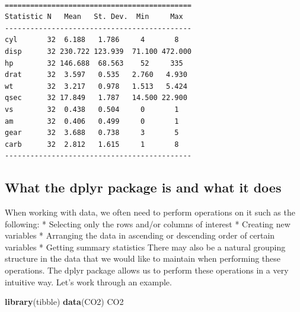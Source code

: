 \documentclass[
]{article}
\newenvironment{Shaded}{\begin{snugshade}}{\end{snugshade}}
\newcommand{\FunctionTok}[1]{\textcolor[rgb]{0.13,0.29,0.53}{\textbf{#1}}}
\newcommand{\NormalTok}[1]{#1}
\begin{document}
\begin{verbatim}

============================================
Statistic N   Mean   St. Dev.  Min     Max  
--------------------------------------------
cyl       32  6.188   1.786     4       8   
disp      32 230.722 123.939  71.100 472.000
hp        32 146.688  68.563    52     335  
drat      32  3.597   0.535   2.760   4.930 
wt        32  3.217   0.978   1.513   5.424 
qsec      32 17.849   1.787   14.500 22.900 
vs        32  0.438   0.504     0       1   
am        32  0.406   0.499     0       1   
gear      32  3.688   0.738     3       5   
carb      32  2.812   1.615     1       8   
--------------------------------------------
\end{verbatim}

\subsection{What the dplyr package is and what it
does}\label{what-the-dplyr-package-is-and-what-it-does}

When working with data, we often need to perform operations on it such
as the following: * Selecting only the rows and/or columns of interest *
Creating new variables * Arranging the data in ascending or descending
order of certain variables * Getting summary statistics There may also
be a natural grouping structure in the data that we would like to
maintain when performing these operations. The dplyr package allows us
to perform these operations in a very intuitive way. Let's work through
an example.

\begin{Shaded}
\begin{Highlighting}[]
\FunctionTok{library}\NormalTok{(tibble)}
\FunctionTok{data}\NormalTok{(CO2)}
\NormalTok{CO2}
\end{Highlighting}
\end{Shaded}
\end{document}
